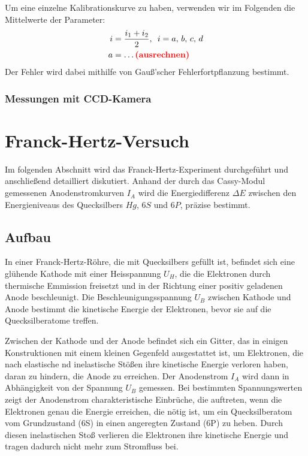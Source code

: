 \documentclass{article}
\newcommand{\defc}{black}
\newcommand{\colorT}[2][blue]{\color{#1}{#2}\color{\defc}}
\newcommand{\todo}[1]{\colorT[red]{\textbf{(#1)}}}
\begin{document}
\begin{multicols}{2}
Um eine einzelne Kalibrationskurve zu haben, verwenden wir im Folgenden die Mittelwerte der Parameter:
\begin{align*}
  i &= \frac{i_1+i_2}{2},\enspace i=a,\,b,\,c,\,d \\
  a &= \dots \todo{ausrechnen}
\end{align*}
Der Fehler wird dabei mithilfe von Gauß'scher Fehlerfortpflanzung bestimmt.


\subsubsection{Messungen mit CCD-Kamera} \label{messungmessung}

\clearpage
\section{Franck-Hertz-Versuch}
Im folgenden Abschnitt wird das Franck-Hertz-Experiment durchgeführt und anschließend detailliert 
diskutiert. Anhand der durch das Cassy-Modul gemessenen Anodenstromkurven \( I_A \) wird die 
Energiedifferenz \( \Delta E \) zwischen den Energieniveaus des Quecksilbers $Hg$, \( 6S \) und \( 6P \), 
präzise bestimmt.
\subsection{Aufbau}
In einer Franck-Hertz-Röhre, die mit Quecksilbers gefüllt ist, befindet sich eine glühende 
Kathode mit einer Heisspannung $U_H$, die die Elektronen durch thermische Emmission freisetzt und in der 
Richtung einer positiv geladenen Anode beschleunigt. Die Beschleunigungsspannung $U_B$ zwischen Kathode 
und Anode bestimmt die kinetische Energie der Elektronen, bevor sie auf die Quecksilberatome treffen.

Zwischen der Kathode und der Anode befindet sich ein Gitter, das in einigen Konstruktionen mit einem kleinen 
Gegenfeld ausgestattet ist, um Elektronen, die nach elastische nd inelastische Stößen ihre kinetische Energie 
verloren haben, daran zu hindern, die Anode zu erreichen. Der Anodenstrom $I_A$
wird dann in Abhängigkeit von der Spannung $U_B$ gemessen. Bei bestimmten Spannungswerten zeigt der Anodenstrom charakteristische Einbrüche, die auftreten, wenn die Elektronen genau die Energie erreichen, die nötig ist, um ein Quecksilberatom vom Grundzustand (6S) in einen angeregten Zustand (6P) zu heben.
 Durch diesen inelastischen Stoß verlieren die Elektronen ihre kinetische Energie und tragen dadurch nicht mehr zum Stromfluss bei.


\end{multicols}
\end{document}

